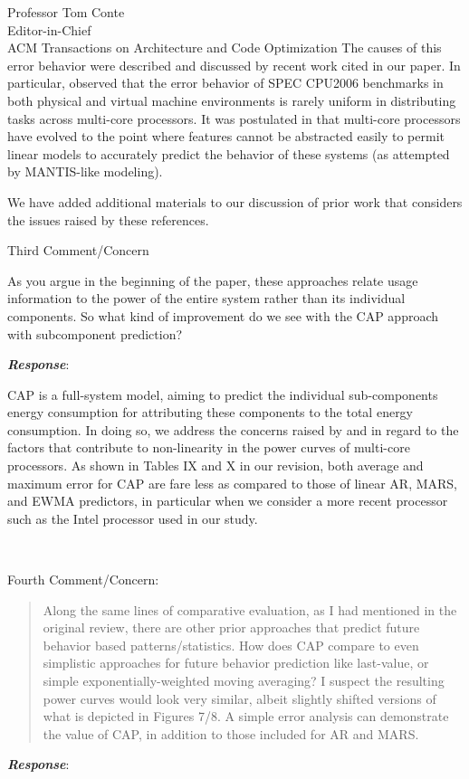 \documentclass[10pt]{letter} %
\newenvironment{rviewcomment}
{~\\%
\begin{bfseries}}
{\end{bfseries}}
\newcommand{\rviewresponse}{\textbf{\textit{Response}}:}
\begin{document}
\begin{letter}{Professor Tom Conte \\
Editor-in-Chief \\
ACM Transactions on Architecture and Code Optimization }
The causes of this error behavior were described and discussed by recent
work cited in our paper. In particular, \cite{Kansal2010} observed that
the error behavior of SPEC CPU2006 benchmarks in both physical and
virtual machine environments is rarely uniform in distributing tasks
across multi-core processors.  It was postulated in
\cite{McCullough2011} that multi-core processors have evolved to the
point where features cannot be abstracted easily to permit linear models
to accurately predict the behavior of these systems (as attempted by
MANTIS-like modeling).

We have added additional materials to our discussion of prior work
that considers the issues raised by these references.
\newpage
\begin{rviewcomment}
  Third Comment/Concern
\end{rviewcomment}

\begin{itshape}
  As you argue in the beginning of the paper, these approaches relate
  usage information to the power of the entire system rather than its
  individual components. So what kind of improvement do we see with the
  CAP approach with subcomponent prediction?
\end{itshape}

\rviewresponse 

CAP is a full-system model, aiming to predict the individual
sub-components energy consumption for attributing these components to
the total energy consumption.  In doing so, we address the concerns
raised by \cite{Kansal2010} and \cite{McCullough2011} in regard to the
factors that contribute to non-linearity in the power curves of
multi-core processors.  As shown in Tables IX and X in our revision,
both average and maximum error for CAP are fare less as compared to
those of linear AR, MARS, and EWMA predictors, in particular when we
consider a more recent processor such as the Intel processor used in our
study.

\begin{rviewcomment}
  Fourth Comment/Concern:
\end{rviewcomment}
\begin{quote}
  \begin{itshape}
    Along the same lines of comparative evaluation, as I had mentioned
    in the original review, there are other prior approaches that
    predict future behavior based patterns/statistics. How does CAP
    compare to even simplistic approaches for future behavior prediction
    like last-value, or simple exponentially-weighted moving averaging?
    I suspect the resulting power curves would look very similar, albeit
    slightly shifted versions of what is depicted in Figures 7/8. A
    simple error analysis can demonstrate the value of CAP, in addition
    to those included for AR and MARS.
  \end{itshape}
\end{quote}
\rviewresponse


\end{letter}
\end{document}
